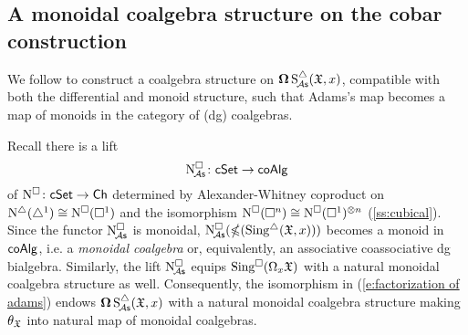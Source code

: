 \subsection{A monoidal coalgebra structure on the cobar construction}


We follow \cite{baues1998hopf} to construct a coalgebra structure on $\cobar \sSchainsA(\fX,x)$, compatible with both the differential and monoid structure, such that Adams's map becomes a map of monoids in the category of (dg) coalgebras.

Recall there is a lift
\[
\cchainsA \colon \cSet \to \coAlg
\]
of $\cchains \colon \cSet \to \Ch$ determined by Alexander-Whitney coproduct on $\schains(\simplex^1) \cong \cchains(\cube^1)$ and the isomorphism $\cchains(\cube^n)\cong \cchains(\cube^1)^{\otimes n}$ (\cref{ss:cubical}). Since the functor $\cchainsA$ is monoidal, $\cchainsA( \ccobar(\sSing(\fX,x)))$ becomes a monoid in $\coAlg$, i.e. a \textit{monoidal coalgebra} or, equivalently, an associative coassociative dg bialgebra. Similarly, the lift $\cchainsA$ equips $\cSing(\loops_x \fX)$ with a natural monoidal coalgebra structure as well. Consequently, the isomorphism in (\ref{e:factorization of adams}) endows $\cobar \sSchainsA(\fX,x)$ with a natural monoidal coalgebra structure making $\theta_\fX$ into natural map of monoidal coalgebras.